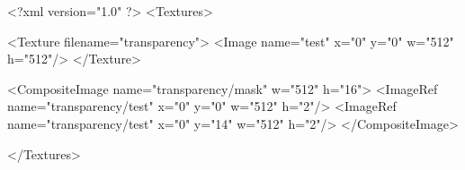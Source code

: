 <?xml version="1.0" ?>
<Textures>

	<Texture filename="transparency">
		<Image name="test" x="0" y="0" w="512" h="512"/>
    </Texture>

	<CompositeImage name="transparency/mask" w="512" h="16">
		<ImageRef name="transparency/test" x="0" y="0" w="512" h="2"/>
		<ImageRef name="transparency/test" x="0" y="14" w="512" h="2"/>
	</CompositeImage>
	
</Textures>
